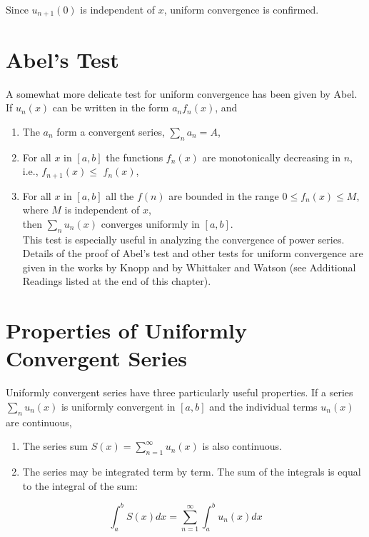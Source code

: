 \documentclass[10pt]{article}
\begin{document}
Since $u_{n+1}(0)$ is independent of $x$, uniform convergence is confirmed.

\section*{Abel's Test}
A somewhat more delicate test for uniform convergence has been given by Abel. If $u_{n}(x)$ can be written in the form $a_{n} f_{n}(x)$, and

\begin{enumerate}
  \item The $a_{n}$ form a convergent series, $\sum_{n} a_{n}=A$,
  \item For all $x$ in $[a, b]$ the functions $f_{n}(x)$ are monotonically decreasing in $n$, i.e., $f_{n+1}(x) \leq$ $f_{n}(x)$,
  \item For all $x$ in $[a, b]$ all the $f(n)$ are bounded in the range $0 \leq f_{n}(x) \leq M$, where $M$ is independent of $x$,\\
then $\sum_{n} u_{n}(x)$ converges uniformly in $[a, b]$.\\
This test is especially useful in analyzing the convergence of power series. Details of the proof of Abel's test and other tests for uniform convergence are given in the works by Knopp and by Whittaker and Watson (see Additional Readings listed at the end of this chapter).
\end{enumerate}

\section*{Properties of Uniformly Convergent Series}
Uniformly convergent series have three particularly useful properties. If a series $\sum_{n} u_{n}(x)$ is uniformly convergent in $[a, b]$ and the individual terms $u_{n}(x)$ are continuous,

\begin{enumerate}
  \item The series sum $S(x)=\sum_{n=1}^{\infty} u_{n}(x)$ is also continuous.
  \item The series may be integrated term by term. The sum of the integrals is equal to the integral of the sum:
\end{enumerate}


\begin{equation*}
\int_{a}^{b} S(x) d x=\sum_{n=1}^{\infty} \int_{a}^{b} u_{n}(x) d x \tag{1.38}
\end{equation*}
\end{document}
